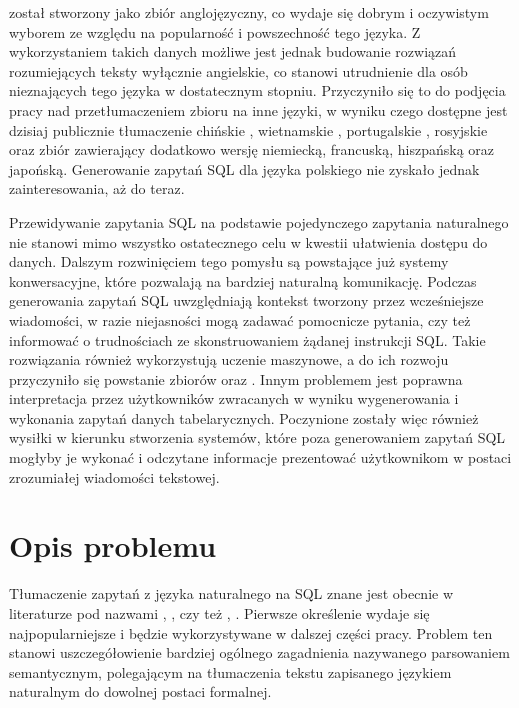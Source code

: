  został stworzony jako zbiór anglojęzyczny, co wydaje się dobrym i oczywistym wyborem ze względu na popularność i powszechność tego języka. Z wykorzystaniem takich danych możliwe jest jednak budowanie rozwiązań rozumiejących teksty wyłącznie angielskie, co stanowi utrudnienie dla osób nieznających tego języka w dostatecznym stopniu. Przyczyniło się to do podjęcia pracy nad przetłumaczeniem zbioru  na inne języki, w wyniku czego dostępne jest dzisiaj publicznie tłumaczenie chińskie , wietnamskie , portugalskie , rosyjskie  oraz zbiór   zawierający dodatkowo wersję niemiecką, francuską, hiszpańską oraz japońską. Generowanie zapytań SQL dla języka polskiego nie zyskało jednak zainteresowania, aż do teraz.

Przewidywanie zapytania SQL na podstawie pojedynczego zapytania naturalnego nie stanowi mimo wszystko ostatecznego celu w kwestii ułatwienia dostępu do danych. Dalszym rozwinięciem tego pomysłu są powstające już systemy konwersacyjne, które pozwalają na bardziej naturalną komunikację. Podczas generowania zapytań SQL uwzględniają kontekst tworzony przez wcześniejsze wiadomości, w razie niejasności mogą zadawać pomocnicze pytania, czy też informować o trudnościach ze skonstruowaniem żądanej instrukcji SQL. Takie rozwiązania również wykorzystują uczenie maszynowe, a do ich rozwoju przyczyniło się powstanie zbiorów   oraz  . Innym problemem jest poprawna interpretacja przez użytkowników zwracanych w wyniku wygenerowania i wykonania zapytań danych tabelarycznych. Poczynione zostały więc również wysiłki w kierunku stworzenia systemów, które poza generowaniem zapytań SQL mogłyby je wykonać i odczytane informacje prezentować użytkownikom w postaci zrozumiałej wiadomości tekstowej.

\section{Opis problemu}
Tłumaczenie zapytań z języka naturalnego na SQL znane jest obecnie w literaturze pod nazwami , , czy też , . Pierwsze określenie wydaje się najpopularniejsze i będzie wykorzystywane w dalszej części pracy. Problem ten stanowi uszczegółowienie bardziej ogólnego zagadnienia nazywanego parsowaniem semantycznym, polegającym na tłumaczenia tekstu zapisanego językiem naturalnym do dowolnej postaci formalnej.

